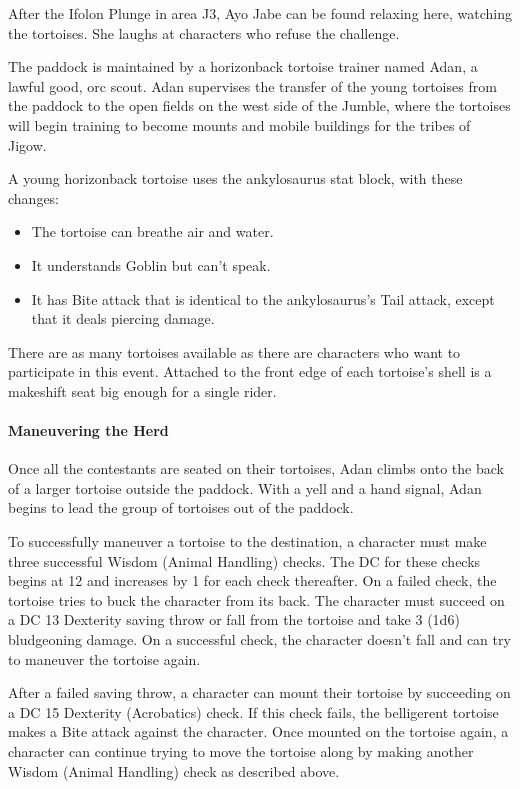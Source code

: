 \documentclass[10pt,a4paper,twoside,twocolumn,openany,nodeprecatedcode]{dndbook}
\begin{document}
After the Ifolon Plunge in area J3, Ayo Jabe can be found relaxing here, watching the tortoises. She laughs at characters who refuse the challenge.

The paddock is maintained by a horizonback tortoise trainer named Adan, a lawful good, orc scout. Adan supervises the transfer of the young tortoises from the paddock to the open fields on the west side of the Jumble, where the tortoises will begin training to become mounts and mobile buildings for the tribes of Jigow.

A young horizonback tortoise uses the ankylosaurus stat block, with these changes:


\begin{itemize}
\item The tortoise can breathe air and water.
\item It understands Goblin but can't speak.
\item It has Bite attack that is identical to the ankylosaurus's Tail attack, except that it deals piercing damage.
\end{itemize}

There are as many tortoises available as there are characters who want to participate in this event. Attached to the front edge of each tortoise's shell is a makeshift seat big enough for a single rider.

\paragraph{Maneuvering the Herd}
Once all the contestants are seated on their tortoises, Adan climbs onto the back of a larger tortoise outside the paddock. With a yell and a hand signal, Adan begins to lead the group of tortoises out of the paddock.

To successfully maneuver a tortoise to the destination, a character must make three successful Wisdom (Animal Handling) checks. The DC for these checks begins at 12 and increases by 1 for each check thereafter. On a failed check, the tortoise tries to buck the character from its back. The character must succeed on a DC 13 Dexterity saving throw or fall from the tortoise and take 3 (1d6) bludgeoning damage. On a successful check, the character doesn't fall and can try to maneuver the tortoise again.

After a failed saving throw, a character can mount their tortoise by succeeding on a DC 15 Dexterity (Acrobatics) check. If this check fails, the belligerent tortoise makes a Bite attack against the character. Once mounted on the tortoise again, a character can continue trying to move the tortoise along by making another Wisdom (Animal Handling) check as described above.
\end{document}
